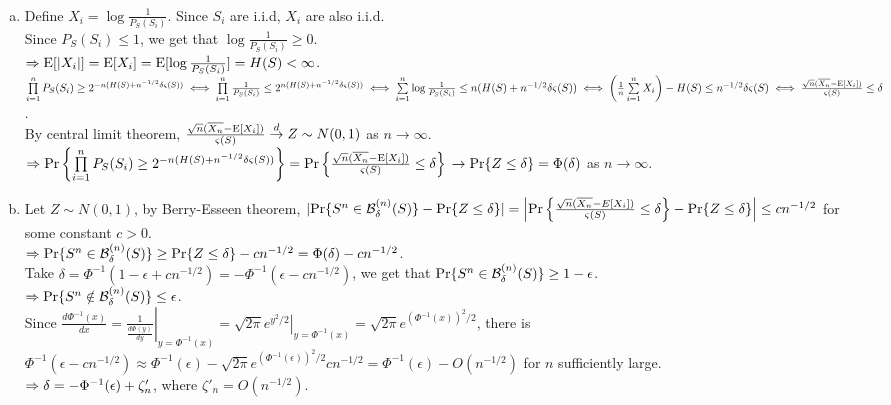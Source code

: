 \begin{pr}$ $

\begin{enumerate}[(a)]

\item Define $X_i=\log\frac1{P_S(S_i)}$. Since $S_i$ are i.i.d, $X_i$ are also i.i.d.\\
Since $P_S(S_i)\leq1$, we get that $\log\frac1{P_S(S_i)}\geq0$.\\
$\Rightarrow\mathrm{E}[|X_i|]=\mathrm{E}[X_i]=\mathrm{E}[\log\frac1{P_S(S_i)}]=H(S)<\infty$.\\
$\prod\limits_{i=1}^nP_S(S_i)\geq2^{-n(H(S)+n^{-1/2}\delta\varsigma(S))}\\
\iff\prod\limits_{i=1}^n\frac1{P_S(S_i)}\leq2^{n(H(S)+n^{-1/2}\delta\varsigma(S))}\\
\iff\sum\limits_{i=1}^n\log\frac1{P_S(S_i)}\leq n(H(S)+n^{-1/2}\delta\varsigma(S))\\
\iff\left(\frac1n\sum\limits_{i=1}^nX_i\right)-H(S)\leq n^{-1/2}\delta\varsigma(S)\\
\iff\frac{\sqrt n(\overline{X_n}-\mathrm{E}[X_i])}{\varsigma(S)}\leq\delta$.\\
By central limit theorem, $\frac{\sqrt n(\overline{X_n}-\mathrm{E}[X_i])}{\varsigma(S)}\overset{d}\to Z\sim N(0, 1)$ as $n\to\infty$.\\
$\Rightarrow\mathrm{Pr}\left\{\prod\limits_{i=1}^nP_S(S_i)\geq2^{-n(H(S)+n^{-1/2}\delta\varsigma(S))}\right\}=\mathrm{Pr}\left\{\frac{\sqrt n(\overline{X_n}-\mathrm{E}[X_i])}{\varsigma(S)}\leq\delta\right\}\\\to\mathrm{Pr}\{Z\leq\delta\}=\Phi(\delta)$ as $n\to\infty$.

\renewcommand{\B}{{\mathcal{B}_\delta^{(n)}(S)}}
\newcommand{\cst}{{n(H(S)+n^{-1/2}\delta\varsigma(S))}}
\item Let $Z\sim N(0, 1)$, by Berry-Esseen theorem, $|\P\{S^n\in\B\}-\P\{Z\leq\delta\}|=\left|\P\left\{\frac{\sqrt n(\overline{X_n}-E[X_i])}{\varsigma(S)}\leq\delta\right\}-\P\{Z\leq\delta\}\right|\leq cn^{-1/2}$ for some constant $c>0$.\\
$\then\P\{S^n\in\B\}\geq\P\{Z\leq\delta\}-cn^{-1/2}=\Phi(\delta)-cn^{-1/2}$.\\
Take $\delta=\Phi^{-1}(1-\epsilon+cn^{-1/2})=-\Phi^{-1}(\epsilon-cn^{-1/2})$, we get that $\P\{S^n\in\B\}\geq1-\epsilon$.\\
$\then\P\{S^n\notin\B\}\leq\epsilon$.\\
Since $\frac{d\Phi^{-1}(x)}{dx}=\left.\frac1{\frac{d\Phi(y)}{dy}}\right|_{y=\Phi^{-1}(x)}=\left.\sqrt{2\pi}e^{y^2/2}\right|_{y=\Phi^{-1}(x)}=\sqrt{2\pi}e^{(\Phi^{-1}(x))^2/2}$, there is $\Phi^{-1}(\epsilon-cn^{-1/2})\approx\Phi^{-1}(\epsilon)-\sqrt{2\pi}e^{(\Phi^{-1}(\epsilon))^2/2}cn^{-1/2}=\Phi^{-1}(\epsilon)-O(n^{-1/2})$ for $n$ sufficiently large.\\
$\Rightarrow\delta=-\Phi^{-1}(\epsilon)+\zeta'_n$, where $\zeta'_n=O(n^{-1/2})$.


\end{enumerate}
\end{pr}
